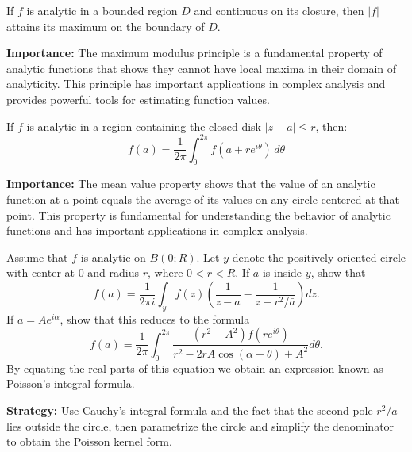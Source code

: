\begin{theorem}
If $f$ is analytic in a bounded region $D$ and continuous on its closure, then $|f|$ attains its maximum on the boundary of $D$.
\end{theorem}

\noindent\textbf{Importance:} The maximum modulus principle is a fundamental property of analytic functions that shows they cannot have local maxima in their domain of analyticity. This principle has important applications in complex analysis and provides powerful tools for estimating function values.



\begin{theorem}
If $f$ is analytic in a region containing the closed disk $|z-a| \leq r$, then:
\[f(a) = \frac{1}{2\pi} \int_0^{2\pi} f(a + re^{i\theta}) \, d\theta\]
\end{theorem}

\noindent\textbf{Importance:} The mean value property shows that the value of an analytic function at a point equals the average of its values on any circle centered at that point. This property is fundamental for understanding the behavior of analytic functions and has important applications in complex analysis.





\begin{problembox}
\begin{problemstatement}
Assume that \( f \) is analytic on \( B(0; R) \). Let \( y \) denote the positively oriented circle with center at 0 and radius \( r \), where \( 0 < r < R \). If \( a \) is inside \( y \), show that
\[f(a) = \frac{1}{2\pi i} \int_{y} f(z) \left( \frac{1}{z - a} - \frac{1}{z - r^2 / \bar{a}} \right) dz.\]
If \( a = Ae^{i\alpha} \), show that this reduces to the formula
\[f(a) = \frac{1}{2\pi} \int_0^{2\pi} \frac{(r^2 - A^2)f(re^{i\theta})}{r^2 - 2rA \cos (\alpha - \theta) + A^2} d\theta.\]
By equating the real parts of this equation we obtain an expression known as Poisson's integral formula.
\end{problemstatement}
\end{problembox}

\noindent\textbf{Strategy:} Use Cauchy's integral formula and the fact that the second pole \( r^2/\bar{a} \) lies outside the circle, then parametrize the circle and simplify the denominator to obtain the Poisson kernel form.

